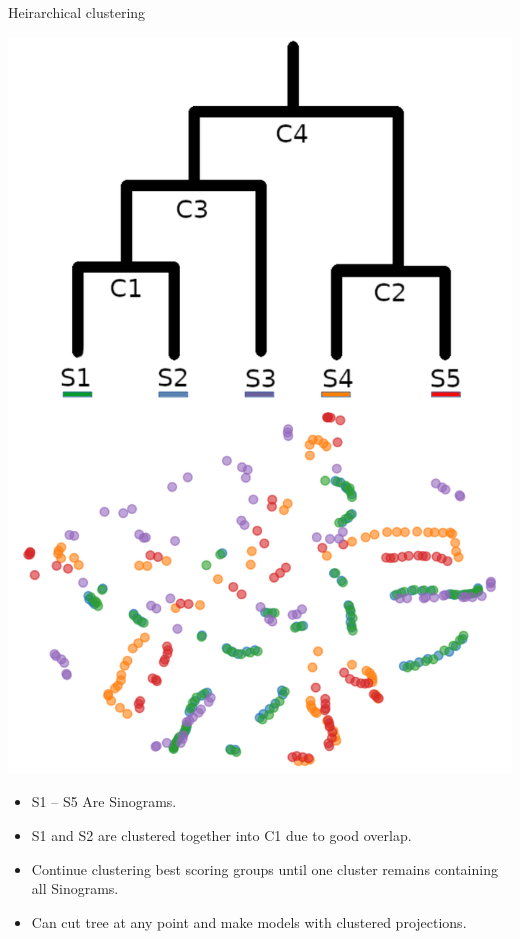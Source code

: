 \documentclass[t, 11pt, xcolor=dvipsnames]{beamer}
\begin{document}
\begin{frame}{Heirarchical clustering}
  \begin{center}
  \begin{minipage}{0.35\textwidth}
  \includegraphics[width=1\textwidth]{images/tree_with_sins.png}
  \end{minipage}
  \begin{minipage}{0.55\textwidth}
    \begin{itemize}
        \item S1 – S5 Are Sinograms.
        \item S1 and S2 are clustered together into C1 due to good overlap.
        \item Continue clustering best scoring groups until one cluster remains containing all Sinograms.
        \item Can cut tree at any point and make models with clustered projections.
    \end{itemize}
  \end{minipage}
  \end{center}
\end{frame}
\end{document}
